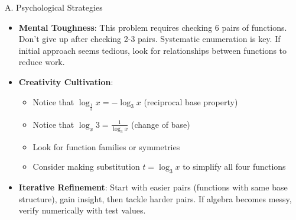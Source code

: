 \documentclass[12pt]{article}
\begin{document}
\begin{strategicbox}{A. Psychological Strategies}
\begin{itemize}[leftmargin=*]
    \item \textbf{Mental Toughness}: This problem requires checking 6 pairs of functions. Don't give up after checking 2-3 pairs. Systematic enumeration is key. If initial approach seems tedious, look for relationships between functions to reduce work.
    
    \item \textbf{Creativity Cultivation}: 
    \begin{itemize}
        \item Notice that $\log_{\frac{1}{3}} x = -\log_3 x$ (reciprocal base property)
        \item Notice that $\log_x 3 = \frac{1}{\log_3 x}$ (change of base)
        \item Look for function families or symmetries
        \item Consider making substitution $t = \log_3 x$ to simplify all four functions
    \end{itemize}
    
    \item \textbf{Iterative Refinement}: Start with easier pairs (functions with same base structure), gain insight, then tackle harder pairs. If algebra becomes messy, verify numerically with test values.
\end{itemize}
\end{strategicbox}
\end{document}

